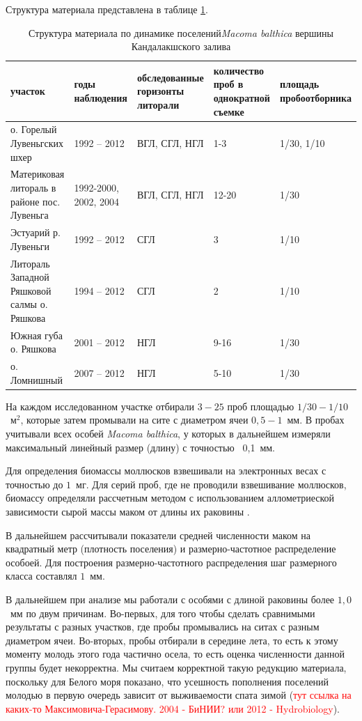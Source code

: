 Структура материала представлена в таблице \ref{tab:material_Kandalaksha}.
\begin{table}
\begin{tabular}{|*{5}{p{}|}} \hline
участок & годы наблюдения & обследованные горизонты литорали & количество проб в однократной съемке & площадь пробоотборника  \\ \hline
о. Горелый Лувеньгских шхер & 1992 -- 2012 & ВГЛ, СГЛ, НГЛ & 1-3 & 1/30, 1/10 \\ \hline
Материковая литораль в районе пос. Лувеньга & 1992-2000, 2002, 2004 & ВГЛ, СГЛ, НГЛ & 12-20 & 1/30 \\ \hline
Эстуарий р. Лувеньги & 1992 -- 2012 & СГЛ & 3 & 1/10 \\ \hline
Литораль Западной Ряшковой салмы о. Ряшкова & 1994 -- 2012 & СГЛ & 2 & 1/10 \\ \hline
Южная губа о. Ряшкова & 2001 -- 2012 & НГЛ & 9-16 & 1/30 \\ \hline
о. Ломнишный & 2007 -- 2012 & НГЛ & 5-10 & 1/30  \\ \hline
\end{tabular}
\caption{Структура материала по динамике поселений{\it Macoma balthica} вершины Кандалакшского залива}
\label{tab:material_Kandalaksha}
\end{table}

На каждом исследованном участке отбирали $3 - 25$ проб площадью $1/30 - 1/10$~м$^2$, которые затем промывали на сите с диаметром ячеи $0,5 - 1$~мм. 
В пробах учитывали всех особей {\it Macoma balthica}, у которых в дальнейшем измеряли максимальный линейный размер (длину) с точностью ~0,1~мм. 

Для определения биомассы моллюсков взвешивали на электронных весах с точностью до $1$~мг. 
Для серий проб, где не проводили взвешивание моллюсков, биомассу определяли рассчетным методом с использованием аллометриеской зависимости сырой массы маком от длины их раковины \cite{Maximovich_et_al_1993}.

В дальнейшем рассчитывали показатели средней численности маком на квадратный метр (плотность поселения) и размерно-частотное распределение особоей.
Для построения размерно-частотного распределения шаг размерного класса составлял $1$~мм.

В дальнейшем при анализе мы работали с особями с длиной раковины более $1,0$~мм по двум причинам. 
Во-первых, для того чтобы сделать сравнимыми результаты с разных участков, где пробы промывались на ситах с разным диаметром ячеи. 
Во-вторых, пробы отбирали в середине лета, то есть к этому моменту молодь этого года частично осела, то есть оценка численности данной группы будет некорректна.
Мы считаем корректной такую редукцию материала, поскольку для Белого моря показано, что усешность пополнения поселений молодью в первую очередь зависит от выживаемости спата зимой (\textcolor{red}{тут ссылка на каких-то Максимовича-Герасимову. 2004 - БиНИИ? или 2012 - Hydrobiology}).

